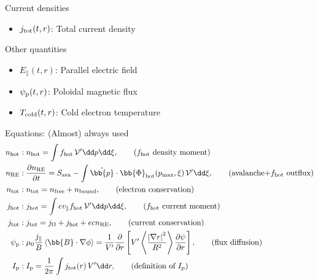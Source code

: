 \documentclass[titleunderline,widescreen1610]{chalmerspresentation}
\newcommand{\Efield}{E_\parallel}
\newcommand{\fhot}{f_{\rm hot}}
\newcommand{\Ip}{I_{\rm p}}
\newcommand{\nhot}{n_{\rm hot}}
\newcommand{\nre}{n_{\rm RE}}
\newcommand{\ntot}{n_{\rm tot}}
\newcommand{\jhot}{j_{\rm hot}}
\newcommand{\johm}{j_{\Omega}}
\newcommand{\jtot}{j_{\rm tot}}
\newcommand{\psip}{\psi_{\rm p}}
\newcommand{\Tcold}{T_{\rm cold}}
\newcommand{\phat}{\hat{\bb{p}}}
\newcommand{\pmax}{p_{\rm max}}
\newcommand{\Vp}{\mathcal{V}'}
\newcommand{\VpVol}{V'}
\begin{document}
\begin{frame}
\begin{minipage}{0.48\textwidth}
\begin{block}{Current densities}
\begin{itemize}
                    \item $\jtot(t,r)$: Total current density
                \end{itemize}
            \end{block}
            \begin{block}{Other quantities}
                \begin{itemize}
                    \item $\Efield(t,r)$: Parallel electric field
                    \item $\psip(t,r)$: Poloidal magnetic flux
                    \item $\Tcold(t,r)$: Cold electron temperature
                \end{itemize}
            \end{block}
        \end{minipage}
    \end{frame}

    \begin{frame}{Equations: (Almost) always used}
        \begin{align}
            \nhot &: \nhot = \int\fhot\,\Vp\dd p\dd\xi, \tag{$\fhot$ density moment}\\
            \nre &: \frac{\partial\nre}{\partial t} = S_{\rm ava} - \int\phat\cdot\bb{\Phi}_{\rm hot}(\pmax, \xi)\,\Vp\dd\xi, \tag{avalanche+$\fhot$ outflux}\\
            \ntot &: \ntot = n_{\rm free} + n_{\rm bound}, \tag{electron conservation}\\
            \jhot &: \jhot = \int ev_\parallel\fhot\,\Vp\dd p\dd\xi, \tag{$\fhot$ current moment}\\
            \jtot &: \jtot = \johm + \jhot + ec\nre, \tag{current conservation}\\
            \psip &: \mu_0\frac{j_\parallel}{B}\left\langle \bb{B}\cdot\nabla\phi \right\rangle =
                \frac{1}{V'}\frac{\partial}{\partial r}\left[
                    V' \left\langle \frac{\left|\nabla r \right|^2}{R^2} \right\rangle
                    \frac{\partial\psi}{\partial r}
                \right], \tag{flux diffusion}\\
            \Ip &: \Ip = \frac{1}{2\pi}\int\jtot(r)\,\VpVol\dd r, \tag{definition of $\Ip$}
        \end{align}
    \end{frame}
\end{document}

